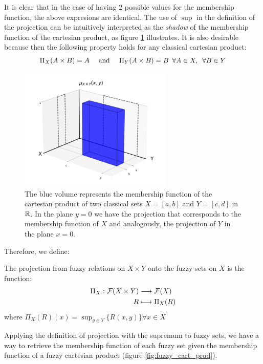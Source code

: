 It is clear that in the case of having 2 possible values for the membership function, the above expresions are identical. The use of $\sup$ in the definition of the projection can be intuitively interpreted as the \textit{shadow} of the membership function of the cartesian product, as figure \ref{fig:class_cart_prod} illustrates. It is also desirable because then the following property holds for any classical  cartesian product:\\
$$ 
\Pi_X(A\times B)=A \quad \textnormal{ and } \quad \Pi_Y(A\times B)=B \forall A\in X, \forall B \in Y
$$

\begin{figure}[ht]
  \centering
  \includegraphics[width=0.65\textwidth]{ch1/figures/class_cart_prod.png}
  \caption{The blue volume represents the membership function of the cartesian product of two classical sets $X=[a,b]$ and $Y=[c,d]$ in $\mathbb{R}$. In the plane $y=0$ we have the projection that corresponds to the membership function of $X$ and analogously, the projection of $Y$ in the plane $x=0$.}
  \label{fig:class_cart_prod}
\end{figure}

Therefore, we define:

\begin{definition}
  The projection from fuzzy relations on $X\times Y$ onto the fuzzy sets on $X$ is the function:
  \[
    \begin{aligned}
      \Pi_X: \mathcal{F}(X\times Y) &\longrightarrow \mathcal{F}(X) \\
      R &\longmapsto \Pi_X(R)
    \end{aligned}
  \]
  where $\Pi_X(R)(x) = \sup_{y\in Y}\{R(x,y)\}\forall x \in X$
\end{definition}

Applying the definition of projection with the supremum to fuzzy sets, we have a way to retrieve the membership function of each fuzzy set given the membership function of a fuzzy cartesian product (figure \ref{fig:fuzzy_cart_prod}). \\






